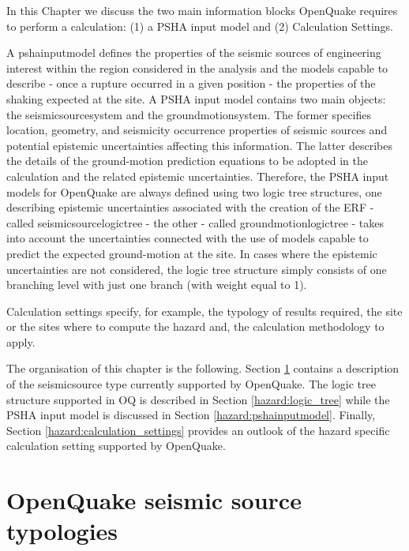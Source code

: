 %
%
In this Chapter we discuss the two main information blocks OpenQuake 
requires to perform a calculation: (1) a PSHA input model and (2) 
Calculation Settings.

A \gls{pshainputmodel} defines the properties of the seismic sources 
of engineering  interest within the region considered in the analysis and the 
models capable to describe - once a rupture occurred in a given position - the 
properties of the shaking expected at the site. 
%
A PSHA input model contains two main objects: the \gls{seismicsourcesystem} 
and the \gls{groundmotionsystem}. 
%
The former specifies location, geometry, and seismicity occurrence properties 
of seismic sources and potential epistemic uncertainties affecting this 
information. 
%
The latter describes the details of the ground-motion prediction equations to 
be adopted in the calculation and the related epistemic uncertainties. 
%
Therefore, the PSHA input models for OpenQuake are always defined using two 
logic tree structures, one describing epistemic uncertainties associated 
with the creation of the ERF - called \gls{seismicsourcelogictree} - 
the other - called \gls{groundmotionlogictree} - takes into account 
the uncertainties connected with the use of models capable to predict the 
expected ground-motion at the site. 
%
In cases where the epistemic uncertainties are not considered, the logic tree 
structure simply consists of one branching level with just one branch (with 
weight equal to 1).

Calculation settings specify, for example, the typology of results required,
the site or the sites where to compute the hazard and, the calculation
methodology to apply.

The organisation of this chapter is the following.  
Section \ref{hazard:seismic_source_types} contains a description of the 
seismicsource type currently supported by OpenQuake. 
The logic tree structure supported in OQ is described in Section 
\ref{hazard:logic_tree} while the PSHA input model is discussed in 
Section \ref{hazard:pshainputmodel}.
Finally, Section \ref{hazard:calculation_settings} provides an outlook 
of the hazard specific calculation setting supported by OpenQuake.
%
\section[OpenQuake seismic source typologies]{OpenQuake seismic source 
typologies}
\label{hazard:seismic_source_types}

%
